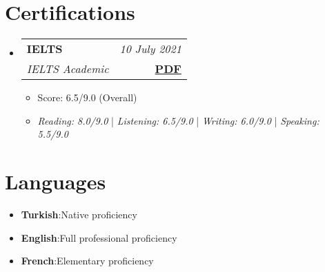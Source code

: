 \documentclass[a4paper,11pt]{article}
\makeatletter
\newcommand{\resumeItem}[2]{
    \item{\textbf{#1}{:\hspace{0.5mm}#2 \vspace{-0.5mm}}}
}
\newcommand{\resumeSubheading}[4]{
\vspace{0.5mm}\item
    \begin{tabular*}{0.98\textwidth}[t]{l@{\extracolsep{\fill}}r}
    \textbf{#1} & \textit{\footnotesize{#4}} \\
    \textit{\footnotesize{#3}} &  \footnotesize{#2} \\
    \end{tabular*}\vspace{-2.4mm}
}
\newcommand{\resumeSubItem}[2]{\resumeItem{#1}{#2}\vspace{-4pt}}
\newcommand{\resumeSubHeadingListStart}{\begin{itemize}[leftmargin=*,labelsep=0mm]}
\newcommand{\resumeHeadingSkillStart}{\begin{itemize}[leftmargin=*,itemsep=1.7mm, rightmargin=2ex]}
\newcommand{\resumeItemListStart}{\begin{justify}\begin{itemize}[leftmargin=3ex, rightmargin=2ex, noitemsep,labelsep=1.2mm,itemsep=0mm]\small}
\newcommand{\resumeSubHeadingListEnd}{\end{itemize}\vspace{2mm}}
\newcommand{\resumeHeadingSkillEnd}{\end{itemize}\vspace{-2mm}}
\newcommand{\resumeItemListEnd}{\end{itemize}\end{justify}\vspace{-2mm}}
\makeatother
\begin{document}

\section{\textbf{Certifications}}
    \resumeSubHeadingListStart
        \resumeSubheading
            {IELTS}{\href{https://drive.google.com/file/d/1jKMRSpP3VZ0Qj-F9RZ2jfN7uosiKkEt6/view?usp=sharing}{\textbf{PDF}}}
            {IELTS Academic}{10 July 2021}
        \resumeItemListStart
            \item {Score: 6.5/9.0 (Overall)}
            \item {\emph{Reading: 8.0/9.0} | \emph{Listening: 6.5/9.0} | \emph{Writing: 6.0/9.0} | \emph{Speaking: 5.5/9.0} }
        \resumeItemListEnd
    \resumeSubHeadingListEnd
\vspace{-6.5mm}


\section{\textbf{Languages}}
    \resumeHeadingSkillStart
        \resumeSubItem{Turkish} {Native proficiency}
        \resumeSubItem{English} {Full professional proficiency}
        \resumeSubItem{French} {Elementary proficiency}
    \resumeHeadingSkillEnd

\vspace{-1mm}


\vfill
{}
\end{document}
